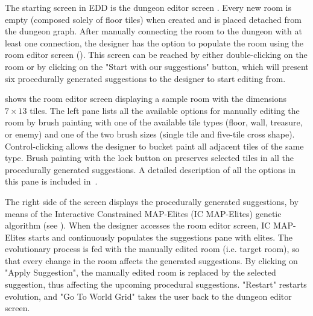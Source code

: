The starting screen in EDD is the dungeon editor screen%
. Every new room is empty (composed solely of floor tiles) when created and is placed detached from the dungeon graph. After manually connecting the room to the dungeon with at least one connection, the designer has the option to populate the room using the room editor screen (). This screen can be reached by either double-clicking on the room or by clicking on the "Start with our suggestions" button, which will present six procedurally generated suggestions to the designer to start editing from. 



 shows the room editor screen displaying a sample room with the dimensions $7\times13$ tiles. The left pane lists all the available options for manually editing the room by brush painting with one of the available tile types (floor, wall, treasure, or enemy) and one of the two brush sizes (single tile and five-tile cross shape). Control-clicking allows the designer to bucket paint all adjacent tiles of the same type. Brush painting with the lock button on preserves selected tiles in all the procedurally generated suggestions. A detailed description of all the options in this pane is included in~.

The right side of the screen displays the procedurally generated suggestions, by means of the Interactive Constrained MAP-Elites (IC MAP-Elites) genetic algorithm (see ). %
When the designer accesses the room editor screen, IC MAP-Elites starts and continuously populates the suggestions pane with elites. The evolutionary process is fed with the manually edited room (i.e. target room), so that every change in the room affects the generated suggestions. By clicking on "Apply Suggestion", the manually edited room is replaced by the selected suggestion, thus affecting the upcoming procedural suggestions. "Restart" restarts evolution, and "Go To World Grid" takes the user back to the dungeon editor screen.